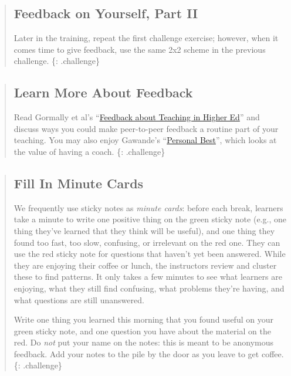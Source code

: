 \begin{quote}
\subsection{Feedback on Yourself, Part
II}\label{feedback-on-yourself-part-ii}

Later in the training, repeat the first challenge exercise; however,
when it comes time to give feedback, use the same 2x2 scheme in the
previous challenge. \{: .challenge\}
\end{quote}

\begin{quote}
\subsection{Learn More About Feedback}\label{learn-more-about-feedback}

Read Gormally et al's
``\href{\{\{\%20page.root\%20\}\}/files/papers/gormally-teaching-feedback-2014.pdf}{Feedback
about Teaching in Higher Ed}'' and discuss ways you could make
peer-to-peer feedback a routine part of your teaching. You may also
enjoy Gawande's
``\href{http://www.newyorker.com/magazine/2011/10/03/personal-best}{Personal
Best}'', which looks at the value of having a coach. \{: .challenge\}
\end{quote}

\begin{quote}
\subsection{Fill In Minute Cards}\label{fill-in-minute-cards}

We frequently use sticky notes as \emph{minute cards}: before each
break, learners take a minute to write one positive thing on the green
sticky note (e.g., one thing they've learned that they think will be
useful), and one thing they found too fast, too slow, confusing, or
irrelevant on the red one. They can use the red sticky note for
questions that haven't yet been answered. While they are enjoying their
coffee or lunch, the instructors review and cluster these to find
patterns. It only takes a few minutes to see what learners are enjoying,
what they still find confusing, what problems they're having, and what
questions are still unanswered.

Write one thing you learned this morning that you found useful on your
green sticky note, and one question you have about the material on the
red. Do \emph{not} put your name on the notes: this is meant to be
anonymous feedback. Add your notes to the pile by the door as you leave
to get coffee. \{: .challenge\}
\end{quote}
